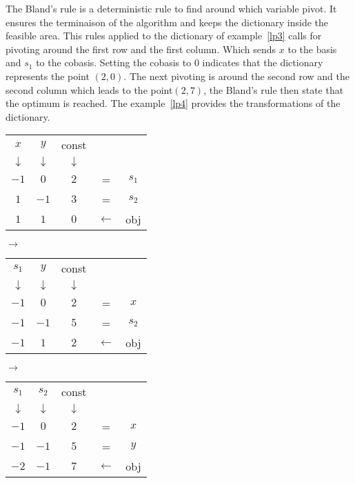 The Bland's rule is a deterministic rule to find around which variable pivot. It ensures the terminaison of the algorithm and keeps the dictionary inside the feasible area. This rules applied to the dictionary of example~\ref{lp3} calls for pivoting around the first row and the first column. Which sends $x$ to the basis and $s_1$ to the cobasis. Setting the cobasis to $0$ indicates that the dictionary represents the point $(2,0)$. The next pivoting is around the second row and the second column which leads to the point$(2,7)$, the Bland's rule then state that the optimum is reached. The example~\ref{lp4} provides the transformations of the dictionary.

\begin{example}
	\begin{tabular}{| c | c || c || c c |}
	\hline	
	$x$ & $y$ & const & & \\
	$\downarrow$ & $\downarrow$ &$\downarrow$  & & \\
	\hline
	\hline	
   	$-1$ & $0$ & $2$ & = & $s_1$\\ \hline	
   	$1$ & $-1$ & $3$ & = & $s_2$\\ \hline \hline	
   	$1$ & $1$ & $0$ & $\leftarrow$ & obj  \\
   	\hline	
 	\end{tabular} $\rightarrow$ 
 	\begin{tabular}{| c | c || c || c c |}
	\hline	
	$s_1$ & $y$ & const & & \\
	$\downarrow$ & $\downarrow$ & $\downarrow$ & & \\
	\hline
	\hline	
   	$-1$ & $0$ & $2$ & = & $x$\\ \hline	
   	$-1$ & $-1$ & $5$ & = & $s_2$\\ \hline \hline	
   	$-1$ & $1$ & $2$ & $\leftarrow$ & obj  \\
   	\hline	
 	\end{tabular} $\rightarrow$ 
 	\begin{tabular}{| c | c || c || c c |}
	\hline	
	$s_1$ & $s_2$ & const & & \\
	$\downarrow$ & $\downarrow$ & $\downarrow$ & & \\
	\hline
	\hline	
   	$-1$ & $0$ & $2$ & = & $x$\\ \hline	
   	$-1$ & $-1$ & $5$ & = & $y$\\ \hline \hline	
   	$-2$ & $-1$ & $7$ & $\leftarrow$ & obj  \\
   	\hline	
 	\end{tabular}
	\label{lp4}
\end{example}


